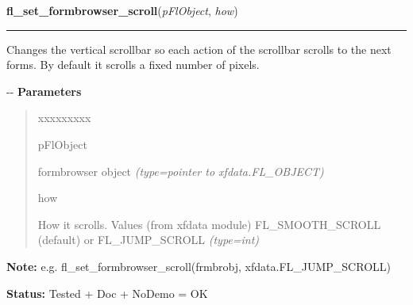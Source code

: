     \label{xformslib:flformbrowser:fl_set_formbrowser_scroll}

    \vspace{0.5ex}

\hspace{.8\funcindent}\begin{boxedminipage}{\funcwidth}

    \raggedright \textbf{fl\_set\_formbrowser\_scroll}(\textit{pFlObject}, \textit{how})

    \vspace{-1.5ex}

    \rule{\textwidth}{0.5\fboxrule}
\setlength{\parskip}{2ex}

Changes the vertical scrollbar so each action of the scrollbar scrolls
to the next forms. By default it scrolls a fixed number of pixels.

-{}-
\setlength{\parskip}{1ex}
      \textbf{Parameters}
      \vspace{-1ex}

      \begin{quote}
        \begin{Ventry}{xxxxxxxxx}

          \item[pFlObject]


formbrowser object
            {\it (type=pointer to xfdata.FL\_OBJECT)}

          \item[how]


How it scrolls. Values (from xfdata module) FL\_SMOOTH\_SCROLL (default)
or FL\_JUMP\_SCROLL
            {\it (type=int)}

        \end{Ventry}

      \end{quote}

\textbf{Note:} 
e.g. fl\_set\_formbrowser\_scroll(frmbrobj, xfdata.FL\_JUMP\_SCROLL)


\textbf{Status:} 
Tested + Doc + NoDemo = OK


    \end{boxedminipage}

    \label{xformslib:flformbrowser:fl_set_formbrowser_hscrollbar}

